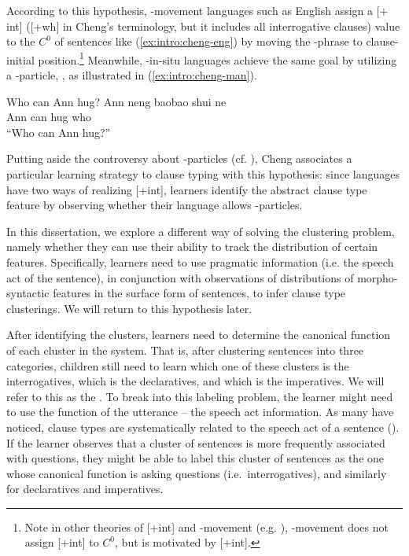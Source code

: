 According to this hypothesis, \twh-movement languages such as English assign a [$+$int] ([+wh] in Cheng's terminology, but it includes all interrogative clauses) value to the $C^{0}$ of sentences like (\ref{ex:intro:cheng-eng}) by moving the \twh-phrase to clause-initial position.\footnote{Note in other theories of [+int] and \twh-movement (e.g. \cite{chomsky1995}), \twh-movement does not assign [+int] to $C^{0}$, but is motivated by [+int]. } Meanwhile, \twh-in-situ languages achieve the same goal by utilizing a \twh-particle, , as illustrated in (\ref{ex:intro:cheng-man}).

Who can Ann hug?
\eex
{}
\gll
Ann neng baobao shui ne\\
Ann can hug who \Sfp\\
\trans ``Who can Ann hug?''
\eex

Putting aside the controversy about \twh-particles (cf. \cite{bruening2007wh, yangyang2018}), Cheng associates a particular learning strategy to clause typing with this hypothesis: since languages have two ways of realizing [+int], learners identify the abstract clause type feature by observing whether their language allows \twh-particles. 


In this dissertation, we explore a different way of solving the clustering problem, namely whether they can use their ability to track the distribution of certain features. Specifically, learners need to use pragmatic information (i.e. the speech act of the sentence), in conjunction with observations of distributions of morpho-syntactic features in the surface form of sentences, to infer clause type clusterings. We will return to this hypothesis later. 



After identifying the clusters, learners need to determine the canonical function of each cluster in the system. That is, after clustering sentences into three categories, children still need to learn which one of these clusters is the interrogatives, which is the declaratives, and which is the imperatives. We will refer to this as the . To break into this labeling problem, the learner might need to use the function of the utterance -- the speech act information. As many have noticed, clause types are systematically related to the speech act of a sentence (\cite{katzpostal1964, sz1985speechact}). If the learner observes that a cluster of sentences is more frequently associated with questions, they might be able to label this cluster of sentences as the one whose canonical function is asking questions (i.e.\ interrogatives), and similarly for declaratives and imperatives. 


